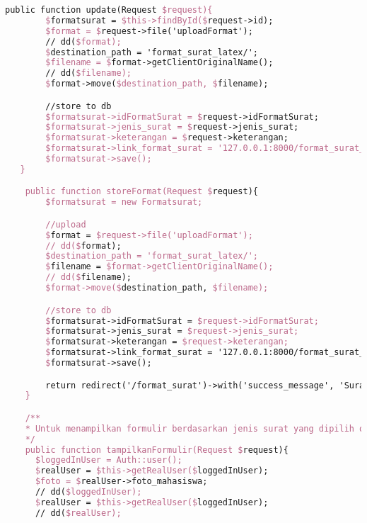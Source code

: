 \begin{lstlisting}[language=tex,basicstyle=\tiny,caption=FormatsuratController.php]
   public function update(Request $request){
        $formatsurat = $this->findById($request->id);
        $format = $request->file('uploadFormat');
        // dd($format);
        $destination_path = 'format_surat_latex/';
        $filename = $format->getClientOriginalName();
        // dd($filename);
        $format->move($destination_path, $filename);

        //store to db
        $formatsurat->idFormatSurat = $request->idFormatSurat;
        $formatsurat->jenis_surat = $request->jenis_surat;
        $formatsurat->keterangan = $request->keterangan;
        $formatsurat->link_format_surat = '127.0.0.1:8000/format_surat_latex/' . $filename;
        $formatsurat->save();
   }

    public function storeFormat(Request $request){
        $formatsurat = new Formatsurat;

        //upload
        $format = $request->file('uploadFormat');
        // dd($format);
        $destination_path = 'format_surat_latex/';
        $filename = $format->getClientOriginalName();
        // dd($filename);
        $format->move($destination_path, $filename);

        //store to db
        $formatsurat->idFormatSurat = $request->idFormatSurat;
        $formatsurat->jenis_surat = $request->jenis_surat;
        $formatsurat->keterangan = $request->keterangan;
        $formatsurat->link_format_surat = '127.0.0.1:8000/format_surat_latex/' . $filename;
        $formatsurat->save();

        return redirect('/format_surat')->with('success_message', 'Surat' . $formatsurat->jenis_surat . 'berhasil dibuat');
    }

    /**
    * Untuk menampilkan formulir berdasarkan jenis surat yang dipilih oleh mahasiswa
    */
    public function tampilkanFormulir(Request $request){
      $loggedInUser = Auth::user();
      $realUser = $this->getRealUser($loggedInUser);
      $foto = $realUser->foto_mahasiswa;
      // dd($loggedInUser);
      $realUser = $this->getRealUser($loggedInUser);
      // dd($realUser);


\end{lstlisting}
